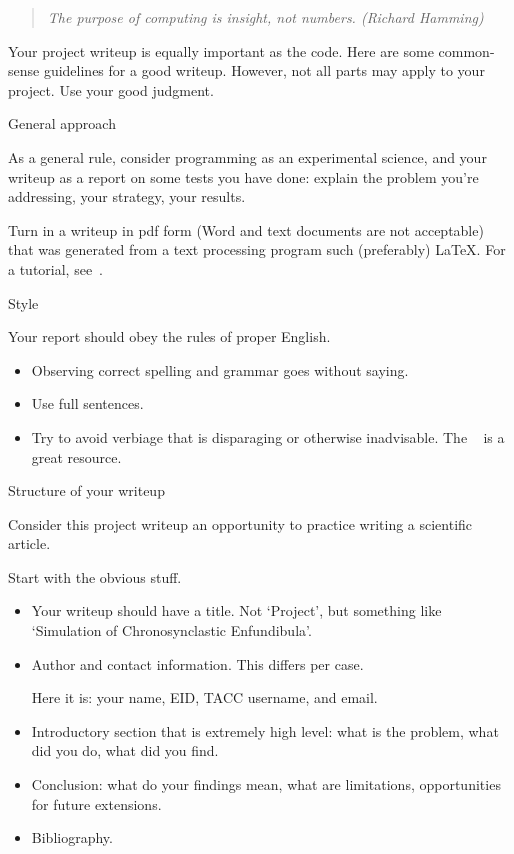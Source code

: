 
\begin{quote}
  \textsl{The purpose of computing is insight, not numbers. (Richard Hamming)}
\end{quote}

Your project writeup is equally important as the code.
Here are
some common-sense guidelines for a good writeup. However, not all
parts may apply to your project.
Use your good judgment.

 {General approach}

As a general rule, consider programming as an experimental science,
and your writeup as a report on some tests you have done: explain
the problem you're addressing, your strategy, your results.

Turn in a writeup in pdf form (Word and text documents are not acceptable)
that was generated from a text processing program such 
(preferably) \LaTeX.
For a tutorial, see~.

 {Style}

Your report should obey the rules of proper English.
\begin{itemize}
\item Observing correct spelling and grammar goes without saying.
\item Use full sentences.
\item Try to avoid verbiage that is disparaging
  or otherwise inadvisable.
  The
  ~\cite{googlestyle}
  is a great resource.
\end{itemize}

 {Structure of your writeup}

Consider this project writeup an opportunity to practice writing a scientific article.

Start with the obvious stuff.
\begin{itemize}
\item Your writeup should have a title. Not `Project',
  but something like `Simulation of Chronosynclastic Enfundibula'.
\item Author and contact information. This differs per case.
\begin{tacc}
    Here it is: your name, EID, TACC username, and email.
\end{tacc}
\item Introductory section that is extremely high level: what is the problem,
  what did you do, what did you find.
\item Conclusion: what do your findings mean, what are limitations, opportunities
  for future extensions.
\item Bibliography.
\end{itemize}

